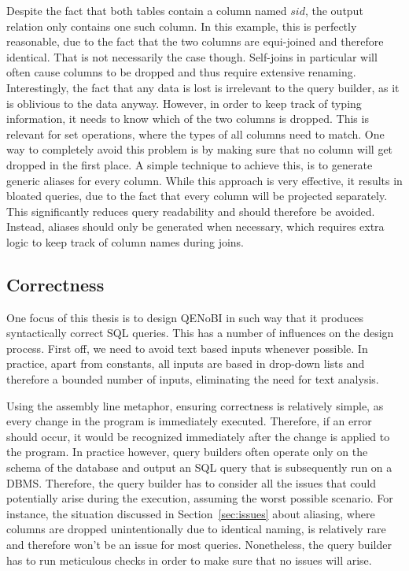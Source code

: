 \documentclass[11pt,a4paper]{globis-book}
\begin{document}
Despite the fact that both tables contain a column named $sid$, the output relation only contains one such column. In this example, this is perfectly reasonable, due to the fact that the two columns are equi-joined and therefore identical. That is not necessarily the case though. Self-joins in particular will often cause columns to be dropped and thus require extensive renaming. Interestingly, the fact that any data is lost is irrelevant to the query builder, as it is oblivious to the data anyway. However, in order to keep track of typing information, it needs to know which of the two columns is dropped. This is relevant for set operations, where the types of all columns need to match.
One way to completely avoid this problem is by making sure that no column will get dropped in the first place. A simple technique to achieve this, is to generate generic aliases for every column. While this approach is very effective, it results in bloated queries, due to the fact that every column will be projected separately. This significantly reduces query readability and should therefore be avoided. Instead, aliases should only be generated when necessary, which requires extra logic to keep track of column names during joins.

\subsection{Correctness}
\label{sec:correctness}
One focus of this thesis is to design QENoBI in such way that it produces syntactically correct SQL queries. This has a number of influences on the design process. First off, we need to avoid text based inputs whenever possible. In practice, apart from constants, all inputs are based in drop-down lists and therefore a bounded number of inputs, eliminating the need for text analysis.

Using the assembly line metaphor, ensuring correctness is relatively simple, as every change in the program is immediately executed. Therefore, if an error should occur, it would be recognized immediately after the change is applied to the program. In practice however, query builders often operate only on the schema of the database and output an SQL query that is subsequently run on a DBMS. Therefore, the query builder has to consider all the issues that could potentially arise during the execution, assuming the worst possible scenario. For instance, the situation discussed in Section~\ref{sec:issues} about aliasing, where columns are dropped unintentionally due to identical naming, is relatively rare and therefore won't be an issue for most queries. Nonetheless, the query builder has to run meticulous checks in order to make sure that no issues will arise.
\end{document}
